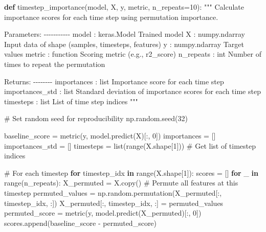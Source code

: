 \documentclass[
  letterpaper,
  DIV=11,
  numbers=noendperiod]{scrreprt}
\newenvironment{Shaded}{\begin{snugshade}}{\end{snugshade}}
\newcommand{\BuiltInTok}[1]{\textcolor[rgb]{0.00,0.23,0.31}{#1}}
\newcommand{\CommentTok}[1]{\textcolor[rgb]{0.37,0.37,0.37}{#1}}
\newcommand{\ControlFlowTok}[1]{\textcolor[rgb]{0.00,0.23,0.31}{\textbf{#1}}}
\newcommand{\DecValTok}[1]{\textcolor[rgb]{0.68,0.00,0.00}{#1}}
\newcommand{\KeywordTok}[1]{\textcolor[rgb]{0.00,0.23,0.31}{\textbf{#1}}}
\newcommand{\NormalTok}[1]{\textcolor[rgb]{0.00,0.23,0.31}{#1}}
\newcommand{\OperatorTok}[1]{\textcolor[rgb]{0.37,0.37,0.37}{#1}}
\begin{document}
\begin{Shaded}
\begin{Highlighting}[]
\KeywordTok{def}\NormalTok{ timestep\_importance(model, X, y, metric, n\_repeats}\OperatorTok{=}\DecValTok{10}\NormalTok{):}
    \CommentTok{"""}
\CommentTok{    Calculate importance scores for each time step using permutation importance.}

\CommentTok{    Parameters:}
\CommentTok{    {-}{-}{-}{-}{-}{-}{-}{-}{-}{-}{-}}
\CommentTok{    model : keras.Model}
\CommentTok{        Trained model}
\CommentTok{    X : numpy.ndarray}
\CommentTok{        Input data of shape (samples, timesteps, features)}
\CommentTok{    y : numpy.ndarray}
\CommentTok{        Target values}
\CommentTok{    metric : function}
\CommentTok{        Scoring metric (e.g., r2\_score)}
\CommentTok{    n\_repeats : int}
\CommentTok{        Number of times to repeat the permutation}

\CommentTok{    Returns:}
\CommentTok{    {-}{-}{-}{-}{-}{-}{-}{-}}
\CommentTok{    importances : list}
\CommentTok{        Importance score for each time step}
\CommentTok{    importances\_std : list}
\CommentTok{        Standard deviation of importance scores for each time step}
\CommentTok{    timesteps : list}
\CommentTok{        List of time step indices}
\CommentTok{    """}

    \CommentTok{\# Set random seed for reproducibility}
\NormalTok{    np.random.seed(}\DecValTok{32}\NormalTok{)}

\NormalTok{    baseline\_score }\OperatorTok{=}\NormalTok{ metric(y, model.predict(X)[:, }\DecValTok{0}\NormalTok{])}
\NormalTok{    importances }\OperatorTok{=}\NormalTok{ []}
\NormalTok{    importances\_std }\OperatorTok{=}\NormalTok{ []}
\NormalTok{    timesteps }\OperatorTok{=} \BuiltInTok{list}\NormalTok{(}\BuiltInTok{range}\NormalTok{(X.shape[}\DecValTok{1}\NormalTok{]))  }\CommentTok{\# Get list of timestep indices}

    \CommentTok{\# For each timestep}
    \ControlFlowTok{for}\NormalTok{ timestep\_idx }\KeywordTok{in} \BuiltInTok{range}\NormalTok{(X.shape[}\DecValTok{1}\NormalTok{]):}
\NormalTok{        scores }\OperatorTok{=}\NormalTok{ []}
        \ControlFlowTok{for}\NormalTok{ \_ }\KeywordTok{in} \BuiltInTok{range}\NormalTok{(n\_repeats):}
\NormalTok{            X\_permuted }\OperatorTok{=}\NormalTok{ X.copy()}
            \CommentTok{\# Permute all features at this timestep}
\NormalTok{            permuted\_values }\OperatorTok{=}\NormalTok{ np.random.permutation(X\_permuted[:, timestep\_idx, :])}
\NormalTok{            X\_permuted[:, timestep\_idx, :] }\OperatorTok{=}\NormalTok{ permuted\_values}
\NormalTok{            permuted\_score }\OperatorTok{=}\NormalTok{ metric(y, model.predict(X\_permuted)[:, }\DecValTok{0}\NormalTok{])}
\NormalTok{            scores.append(baseline\_score }\OperatorTok{{-}}\NormalTok{ permuted\_score)}


\end{Highlighting}
\end{Shaded}
\end{document}
